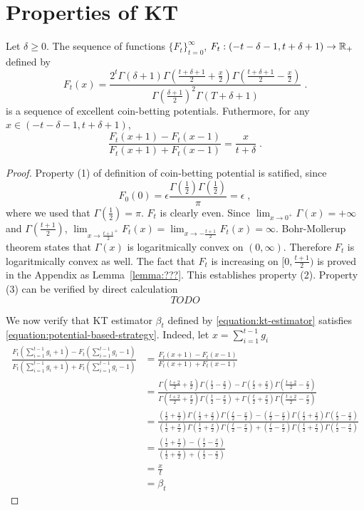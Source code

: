 \section{Properties of KT}

\begin{theorem}[KT potential]
\label{theorem:kt-potential}
Let $\delta \ge 0$. The sequence of functions $\{F_t\}_{t=0}^\infty$, $F_t:(-t-\delta-1, t+\delta+1) \to \mathbb{R}_+$
defined by
$$
F_t(x) = \frac{2^t \Gamma(\delta + 1) \Gamma(\frac{t+\delta+1}{2} + \frac{x}{2}) \Gamma(\frac{t+\delta+1}{2} - \frac{x}{2})}{\Gamma(\frac{\delta+1}{2})^2 \Gamma(T+\delta+1)} \; .
$$
is a sequence of excellent coin-betting potentials.
Futhermore, for any $x \in (-t-\delta-1, t+\delta+1)$,
$$
\frac{F_t(x+1) - F_{t}(x-1)}{F_t(x+1) + F_{t}(x-1)} = \frac{x}{t+\delta} \; .
$$
\end{theorem}

\begin{proof}
Property (1) of definition of coin-betting potential is satified, since
$$
F_0(0) = \epsilon \frac{\Gamma(\frac{1}{2}) \Gamma(\frac{1}{2})}{\pi} = \epsilon \; ,
$$
where we used that $\Gamma(\frac{1}{2}) = \pi$. $F_t$ is clearly even.
Since $\lim_{x \to 0^+} \Gamma(x) = +\infty$ and $\Gamma(\frac{t+1}{2})$,
$\lim_{x \to \frac{t+1}{2}^+} F_t(x) = \lim_{x \to -\frac{t+1}{2}} F_t(x) = \infty$.
Bohr-Mollerup theorem states that $\Gamma(x)$ is logaritmically convex
on $(0,\infty)$. Therefore $F_t$ is logaritmically convex as well.
The fact that $F_t$ is increasing on $[0,\frac{t+1}{2})$ is proved
in the Appendix as Lemma~\ref{lemma:???}. This establishes property (2).
Property (3) can be verified by direct calculation
$$
TODO
$$

We now verify that KT estimator $\beta_t$ defined by \eqref{equation:kt-estimator}
satisfies \eqref{equation:potential-based-strategy}. Indeed, let $x=\sum_{i=1}^{t-1} g_i$
\begin{align*}
\frac{F_t(\sum_{i=1}^{t-1} g_i + 1) - F_t(\sum_{i=1}^{t-1} g_i - 1)}{F_t(\sum_{i=1}^{t-1} g_i + 1) + F_t(\sum_{i=1}^{t-1} g_i - 1)}
& = \frac{F_t(x + 1) - F_t(x - 1)}{F_t(x + 1) + F_t(x - 1)} \\
& = \frac{\Gamma(\frac{t+2}{2} + \frac{x}{2}) \Gamma(\frac{t}{2} - \frac{x}{2}) - \Gamma(\frac{t}{2} + \frac{x}{2}) \Gamma(\frac{t+2}{2} - \frac{x}{2})}{\Gamma(\frac{t+2}{2} + \frac{x}{2}) \Gamma(\frac{t}{2} - \frac{x}{2}) + \Gamma(\frac{t}{2} + \frac{x}{2}) \Gamma(\frac{t+2}{2} - \frac{x}{2})} \\
& = \frac{(\frac{t}{2} + \frac{x}{2})\Gamma(\frac{t}{2} + \frac{x}{2}) \Gamma(\frac{t}{2} - \frac{x}{2}) - (\frac{t}{2} - \frac{x}{2})\Gamma(\frac{t}{2} + \frac{x}{2}) \Gamma(\frac{t}{2} - \frac{x}{2})}{(\frac{t}{2} + \frac{x}{2})\Gamma(\frac{t}{2} + \frac{x}{2}) \Gamma(\frac{t}{2} - \frac{x}{2}) + (\frac{t}{2} - \frac{x}{2})\Gamma(\frac{t}{2} + \frac{x}{2}) \Gamma(\frac{t}{2} - \frac{x}{2})} \\
& = \frac{(\frac{t}{2} + \frac{x}{2}) - (\frac{t}{2} - \frac{x}{2})}{(\frac{t}{2} + \frac{x}{2}) + (\frac{t}{2} - \frac{x}{2})} \\
& = \frac{x}{t} \\
& = \beta_t
\end{align*}
\end{proof}
